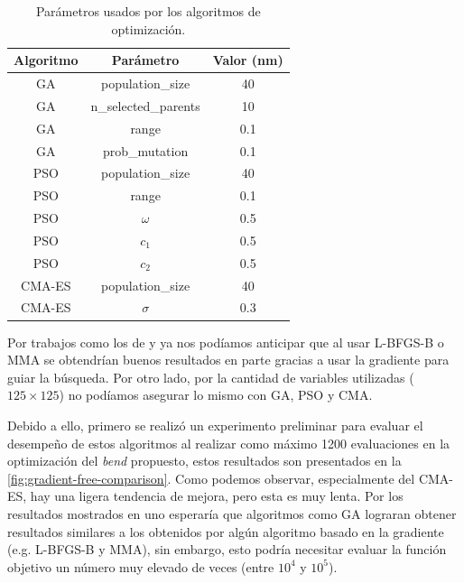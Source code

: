 \begin{table}[ht]
    \centering
    \begin{tabular}{|c|c|c|}
    \hline 
    Algoritmo & Parámetro &  Valor (nm) \\
    \hline
    GA & population\_size & 40 \\
    GA & n\_selected\_parents & 10 \\
    GA & range & 0.1 \\
    GA & prob\_mutation & 0.1 \\
    PSO & population\_size & 40 \\
    PSO & range & 0.1 \\
    PSO & $\omega$ & 0.5 \\
    PSO & $c_1$ & 0.5 \\
    PSO & $c_2$ & 0.5 \\
    CMA-ES & population\_size & 40 \\
    CMA-ES & $\sigma$ & 0.3 \\
    \hline 
    \end{tabular}
    \caption{Parámetros usados por los algoritmos de optimización.}
    \label{tab:alg-parameters}
\end{table}

Por trabajos como los de \cite{Su2020} y \cite{Christiansen2021} ya nos podíamos anticipar que al usar
L-BFGS-B o MMA se obtendrían buenos resultados en parte gracias a usar la gradiente para guiar la búsqueda.
Por otro lado, por la cantidad de variables utilizadas ($125 \times 125$) no podíamos asegurar lo mismo
con GA, PSO y CMA. 

Debido a ello, primero se realizó un experimento preliminar para evaluar el desempeño de estos
algoritmos al realizar como máximo 1200 evaluaciones en la optimización del \emph{bend} propuesto, 
estos resultados son presentados en la \autoref{fig:gradient-free-comparison}.
Como podemos observar, especialmente del CMA-ES, hay una ligera tendencia de mejora, pero esta es muy lenta.
Por los resultados mostrados en \cite{Christiansen2021matlab} uno esperaría que algoritmos como GA lograran 
obtener resultados similares a los obtenidos por algún algoritmo basado en la gradiente (e.g. L-BFGS-B y MMA), 
sin embargo, esto podría necesitar evaluar la función objetivo un número muy elevado de veces (entre $10^4$ y $10^5$).


